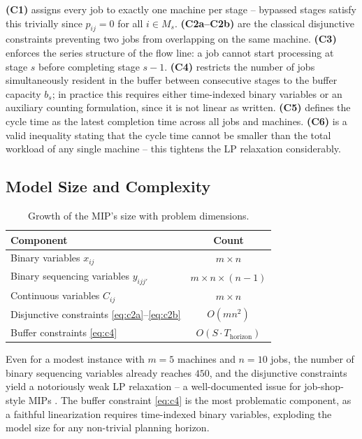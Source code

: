 \documentclass[11pt,a4paper]{article}
\begin{document}
\noindent
\textbf{(C1)} assigns every job to exactly one machine per stage --
bypassed stages satisfy this trivially since $p_{ij}=0$ for all $i \in
M_s$. \textbf{(C2a--C2b)} are the classical disjunctive constraints
preventing two jobs from overlapping on the same machine. \textbf{(C3)}
enforces the series structure of the flow line: a job cannot start
processing at stage $s$ before completing stage $s-1$. \textbf{(C4)}
restricts the number of jobs simultaneously resident in the buffer between
consecutive stages to the buffer capacity $b_s$; in practice this requires
either time-indexed binary variables or an auxiliary counting formulation,
since it is not linear as written. \textbf{(C5)} defines the cycle time as
the latest completion time across all jobs and machines. \textbf{(C6)} is a
valid inequality stating that the cycle time cannot be smaller than the
total workload of any single machine -- this tightens the LP relaxation
considerably.

\subsection{Model Size and Complexity}

\begin{table}[h!]
\centering
\begin{tabular}{@{}lc@{}}
\toprule
Component & Count \\
\midrule
Binary variables $x_{ij}$ & $m \times n$ \\
Binary sequencing variables $y_{ijj'}$ & $m \times n \times (n-1)$ \\
Continuous variables $C_{ij}$ & $m \times n$ \\
Disjunctive constraints \eqref{eq:c2a}--\eqref{eq:c2b} & $O(m n^2)$ \\
Buffer constraints \eqref{eq:c4} & $O(S \cdot T_{\text{horizon}})$ \\
\bottomrule
\end{tabular}
\caption{Growth of the MIP's size with problem dimensions.}
\end{table}

Even for a modest instance with $m=5$ machines and $n=10$ jobs, the number
of binary sequencing variables already reaches $450$, and the disjunctive
constraints yield a notoriously weak LP relaxation -- a well-documented
issue for job-shop-style MIPs \citep{pinedo2016scheduling}. The buffer
constraint \eqref{eq:c4} is the most problematic component, as a faithful
linearization requires time-indexed binary variables, exploding the model
size for any non-trivial planning horizon.
\end{document}
